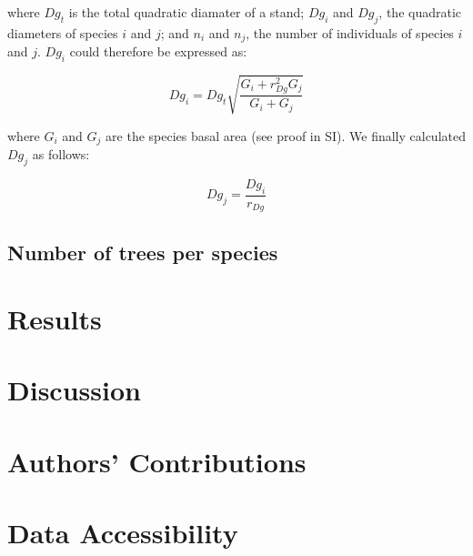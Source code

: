 \documentclass[a4paper]{article}
\begin{document}
\begin{enumerate}
  where $Dg_t$ is the total quadratic diamater of a stand; $Dg_i$ and $Dg_j$, the quadratic diameters of species $i$ and $j$; and $n_i$ and $n_j$, the number of individuals of species $i$ and $j$. $Dg_i$ could therefore be expressed as:

  \begin{equation}\label{}
    Dg_i = Dg_t\sqrt{\frac{G_i + r_{Dg}^2G_j}{G_i + G_j}}
  \end{equation}

  where $G_i$ and $G_j$ are the species basal area (see proof in SI). We finally calculated $Dg_j$ as follows:

  \begin{equation}\label{}
    Dg_j = \frac{Dg_i}{r_{Dg}}
  \end{equation}

\end{enumerate}


\subsection*{Number of trees per species}





\section*{Results}

\section*{Discussion}


\section*{Authors' Contributions}

\section*{Data Accessibility}




\clearpage
\end{document}

